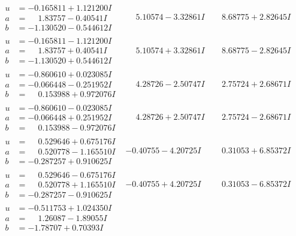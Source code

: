 \documentclass[1p]{elsarticle_modified}
\theoremstyle{definition}
\begin{document}
$$\begin{array}{c|c|c}
\begin{aligned}
u &= -0.165811 + 1.121200 I \\
a &= \phantom{-}1.83757 - 0.40541 I \\
b &= -1.130520 - 0.544612 I\end{aligned}
 & \phantom{-}5.10574 - 3.32861 I & \phantom{-}8.68775 + 2.82645 I \\ \hline\begin{aligned}
u &= -0.165811 - 1.121200 I \\
a &= \phantom{-}1.83757 + 0.40541 I \\
b &= -1.130520 + 0.544612 I\end{aligned}
 & \phantom{-}5.10574 + 3.32861 I & \phantom{-}8.68775 - 2.82645 I \\ \hline\begin{aligned}
u &= -0.860610 + 0.023085 I \\
a &= -0.066448 - 0.251952 I \\
b &= \phantom{-}0.153988 + 0.972076 I\end{aligned}
 & \phantom{-}4.28726 - 2.50747 I & \phantom{-}2.75724 + 2.68671 I \\ \hline\begin{aligned}
u &= -0.860610 - 0.023085 I \\
a &= -0.066448 + 0.251952 I \\
b &= \phantom{-}0.153988 - 0.972076 I\end{aligned}
 & \phantom{-}4.28726 + 2.50747 I & \phantom{-}2.75724 - 2.68671 I \\ \hline\begin{aligned}
u &= \phantom{-}0.529646 + 0.675176 I \\
a &= \phantom{-}0.520778 - 1.165510 I \\
b &= -0.287257 + 0.910625 I\end{aligned}
 & -0.40755 - 4.20725 I & \phantom{-}0.31053 + 6.85372 I \\ \hline\begin{aligned}
u &= \phantom{-}0.529646 - 0.675176 I \\
a &= \phantom{-}0.520778 + 1.165510 I \\
b &= -0.287257 - 0.910625 I\end{aligned}
 & -0.40755 + 4.20725 I & \phantom{-}0.31053 - 6.85372 I \\ \hline\begin{aligned}
u &= -0.511753 + 1.024350 I \\
a &= \phantom{-}1.26087 - 1.89055 I \\
b &= -1.78707 + 0.70393 I\end{aligned}

\end{array}$$
\end{document}
